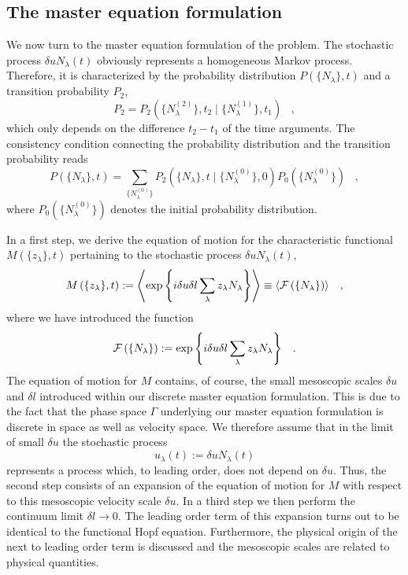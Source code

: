 \subsection{The master equation formulation}
We now turn to the master equation formulation of the problem.
The stochastic process $\delta u N_{\lambda}(t)$ obviously
represents a
homogeneous Markov process.
Therefore, it is characterized by the probability distribution
$P \left( \{N_{\lambda}\} ,t \right)$ and a transition
probability $P_2$,
\begin{equation}
P_2 =
P_2 \left( \{N_{\lambda}^{(2)} \} , t_2 \mid
\{N_{\lambda}^{(1)} \} ,
t_1 \right)
\;\;\; ,        
\end{equation}
which only depends on the difference $t_2 - t_1$ of the time
arguments. The consistency condition connecting the probability
distribution and the transition probability reads
\begin{equation}
P \left( \{N_{\lambda} \},t \right) = \sum_{\{N_{\lambda}^{(0)}\}}
P_2 \left( \{N_{\lambda} \} , t \mid \{N_{\lambda}^{(0)} \} ,
0 \right)
P_0 \left( \{N_{\lambda}^{(0)} \} \right) \;\;\; ,   \label{PROBMEQ}
\end{equation}
where $P_0 \left( \{N_{\lambda}^{(0)} \} \right)$ denotes the initial
probability distribution.

In a first step, we derive the equation of motion
for the
characteristic functional $M\left( \{ z_{\lambda} \},t \right)$
pertaining to the stochastic process $\delta u N_{\lambda}(t)$,
\begin{equation}
M \left( \{z_{\lambda} \},t \right) := \left\langle
\exp \left\{ i\delta u\delta l \sum_{\lambda} z_{\lambda}
N_{\lambda} \right\}
\right \rangle \equiv \left\langle {\cal{F}} \left(
\{N_{\lambda} \} \right)
\right\rangle
\;\;\; ,           \label{GENFUNC}
\end{equation}
where we have introduced the function
\begin{displaymath}
{\cal{F}} \left( \{N_{\lambda} \} \right)
:= \exp \left\{ i\delta u \delta l
\sum_{\lambda} z_{\lambda} N_{\lambda}
\right\} \;\;\; .
\end{displaymath}
The equation of motion for $M$ contains,
of course, the small mesoscopic scales
$\delta u$ and $\delta l$ introduced
within our discrete master equation
formulation. This is due to the fact that the phase space $\Gamma$
underlying our master
equation formulation is discrete in space as well as velocity space.
We therefore assume that in the limit of small $\delta u$
the stochastic process
\begin{displaymath}
u_{\lambda}(t) := \delta u N_{\lambda}(t)
\end{displaymath}
represents a process which, to leading order, does not depend on
$\delta u$.
Thus, the second step consists of an expansion
of the equation of motion for $M$
with respect to this mesoscopic velocity scale
$\delta u$. In a third step
we then perform the continuum limit $\delta l \longrightarrow 0$.
The leading order term of this
expansion turns out to be identical to the functional Hopf equation.
Furthermore, the physical origin of the next to leading order
term is
discussed and the mesoscopic scales are related to
physical quantities.


